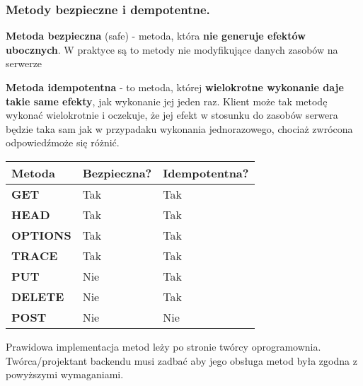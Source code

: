 \documentclass[../main.tex]{subfiles}
\begin{document}
    \subsubsection{Metody bezpieczne i dempotentne.}

    \begin{theorem}
        \textbf{Metoda bezpieczna} (safe) - metoda, która \textbf{nie generuje efektów ubocznych}. W praktyce są to metody nie modyfikujące danych zasobów na serwerze
    \end{theorem}

    \begin{theorem}
        \textbf{Metoda idempotentna} - to metoda, której \textbf{wielokrotne wykonanie daje takie same efekty}, jak wykonanie jej jeden raz. Klient może tak metodę wykonać wielokrotnie i oczekuje, że jej efekt w stosunku do zasobów serwera będzie taka sam jak w przypadaku wykonania jednorazowego, chociaż zwrócona odpowiedźmoże się różnić.
    \end{theorem}

    \begin{table}[H]
        \begin{center}
            \begin{tabular}{|p{5cm}|p{5cm}|p{5cm}|}
                \hline
                \textbf{Metoda} & \textbf{Bezpieczna?} & \textbf{Idempotentna?}\\
                \hline
                \hline
                \textbf{GET} & Tak & Tak \\
                \hline
                \textbf{HEAD} & Tak & Tak \\
                \hline
                \textbf{OPTIONS} & Tak & Tak \\
                \hline
                \textbf{TRACE} & Tak & Tak \\
                \hline
                \textbf{PUT} & Nie & Tak \\
                \hline
                \textbf{DELETE} & Nie & Tak \\
                \hline
                \textbf{POST} & Nie & Nie \\
                \hline
            \end{tabular}
        \end{center}
    \end{table}
    Prawidowa implementacja metod leży po stronie twórcy oprogramownia. Twórca/projektant backendu musi zadbać aby jego obsługa metod była zgodna z powyższymi wymaganiami.
\end{document}
